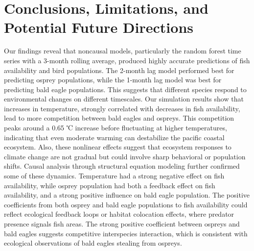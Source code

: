 \documentclass{article}
\begin{document}
\section{Conclusions, Limitations, and Potential Future Directions}
Our findings reveal that noncausal models, particularly the random forest time series with a 3-month rolling average, produced highly accurate predictions of fish availability and bird populations. The 2-month lag model performed best for predicting osprey populations, while the 1-month lag model was best for predicting bald eagle populations. This suggests that different species respond to environmental changes on different timescales. Our simulation results show that increases in temperature, strongly correlated with decreases in fish availability, lead to more competition between bald eagles and ospreys. This competition peaks around a 0.65 ℃ increase before fluctuating at higher temperatures, indicating that even moderate warming can destabilize the pacific coastal ecosystem. Also, these nonlinear effects suggest that ecosystem responses to climate change are not gradual but could involve sharp behavioral or population shifts. Causal analysis through structural equation modeling further confirmed some of these dynamics. Temperature had a strong negative effect on fish availability, while osprey population had both a feedback effect on fish availability, and a strong positive influence on bald eagle population. The positive coefficients from both osprey and bald eagle populations to fish availability could reflect ecological feedback loops or habitat colocation effects, where predator presence signals fish areas. The strong positive coefficient between ospreys and bald eagles suggests competitive interspecies interaction, which is consistent with ecological observations of bald eagles stealing from ospreys. 
\end{document}
